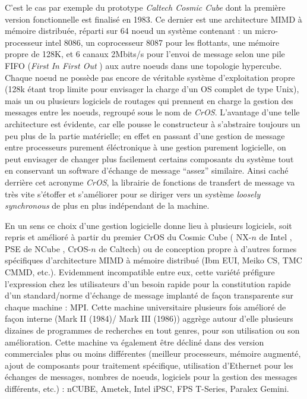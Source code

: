 C'est le cas par exemple du prototype \textit{Caltech Cosmic Cube} dont la première version fonctionnelle est finalisé en 1983. Ce dernier est une architecture MIMD à mémoire distribuée, réparti sur 64 noeud un système contenant : un micro-processeur intel 8086, un coprocesseur 8087 pour les flottants, une mémoire propre de 128K, et 6 canaux 2Mbits/s pour l'envoi de message selon une pile FIFO (\textit{First In First Out} ) aux autre noeuds dans une topologie hypercube. Chaque noeud ne possède pas encore de véritable système d'exploitation propre (128k étant trop limite pour envisager la charge d'un OS complet de type Unix), mais un ou plusieurs logiciels de routages qui prennent en charge la gestion des messages entre les noeuds, regroupé sous le nom de \textit{CrOS}. L'avantage d'une telle architecture est évidente, car elle pousse le constructeur à s'abstraire toujours un peu plus de la partie matérielle; en effet en passant d'une gestion de message entre processeurs purement éléctronique à une gestion purement logicielle, on peut envisager de changer plus facilement certains composants du système tout en conservant un software d'échange de message \enquote{assez} similaire. Ainsi caché derrière cet acronyme \textit{CrOS}, la librairie de fonctions de transfert de message va très vite s'étoffer et s'améliorer pour se diriger vers un système \textit{loosely synchronous}  de plus en plus indépendant de la machine.  %

En un sens ce choix d'une gestion logicielle donne lieu à plusieurs logiciels, soit repris et amélioré à partir du premier CrOS du Cosmic Cube ( NX-$n$ de Intel , PSE de NCube , CrOS-$n$ de Caltech) ou de conception propre à d'autres formes spécifiques d'architecture MIMD à mémoire distribué (Ibm EUI, Meiko CS, TMC CMMD, etc.). Evidemment incompatible entre eux, cette variété préfigure l'expression chez les utilisateurs d'un besoin rapide pour la constitution rapide d'un standard/norme d'échange de message implanté de façon transparente sur chaque machine : MPI. Cette machine universitaire plusieurs fois amélioré de façon interne (Mark II (1984)/ Mark III (1986)) aggrège autour d'elle plusieurs dizaines de programmes de recherches en tout genres, pour son utilisation ou son amélioration. Cette machine va également être décliné dans des version commerciales plus ou moins différentes (meilleur processeurs, mémoire augmenté, ajout de composants pour traitement spécifique, utilisation d'Ethernet pour les échanges de messages, nombres de noeuds, logiciels pour la gestion des messages différents, etc.) : nCUBE, Ametek, Intel iPSC, FPS T-Series, Paralex Gemini.

